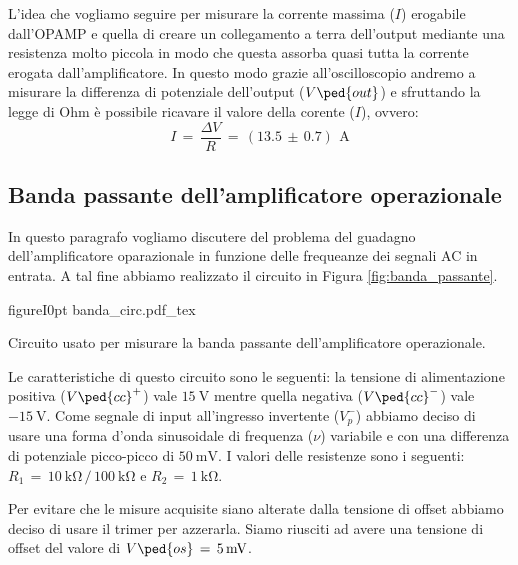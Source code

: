 L'idea che vogliamo seguire per misurare la corrente massima ($I$) erogabile dall'OPAMP e quella di creare un collegamento a terra dell'output mediante una resistenza molto piccola in modo che questa assorba quasi tutta la corrente erogata dall'amplificatore. In questo modo grazie all'oscilloscopio andremo a misurare la differenza di potenziale dell'output ($V\ped{out}$) e sfruttando la legge di Ohm è possibile ricavare il valore della corente ($I$), ovvero:
\begin{equation}
	I\,=\,\frac{\Delta V}{R}\,=\,(13.5\,\pm\,0.7)\,\SI{}{\ampere}
\end{equation}

\subsection*{Banda passante dell'amplificatore operazionale}

In questo paragrafo vogliamo discutere del problema del guadagno dell'amplificatore oparazionale in funzione delle frequeanze dei segnali AC in entrata. A tal fine abbiamo realizzato il circuito in Figura \ref{fig:banda_passante}.


\begin{wrapfloat}{figure}{I}{0pt}
	\def\svgwidth{0.48\textwidth}
    {banda_circ.pdf_tex}
    \caption{Circuito usato per misurare la banda passante dell'amplificatore operazionale.}
    \label{fig:banda_passante}
\end{wrapfloat}

Le caratteristiche di questo circuito sono le seguenti: la tensione di alimentazione positiva ($V\ped{cc}^+$) vale $\SI{+15}{\volt}$ mentre quella negativa ($V\ped{cc}^-$) vale $\SI{-15}{\volt}$. Come segnale di input all'ingresso invertente ($V_p^-$) abbiamo deciso di usare una forma d'onda sinusoidale di frequenza ($\nu$) variabile e con una differenza di potenziale picco-picco di $\SI{50}{\milli\volt}$. I valori delle resistenze sono i seguenti: $R_1\,=\,\SI{10}{\kilo\ohm}\,/\,\SI{100}{\kilo\ohm}$ e $R_2\,=\,\SI{1}{\kilo\ohm}$.

Per evitare che le misure acquisite siano alterate dalla tensione di offset abbiamo deciso di usare il trimer per azzerarla. Siamo riusciti ad avere una tensione di offset del valore di $V\ped{os}\,=\,\SI{5}{\milli\volt}$.

